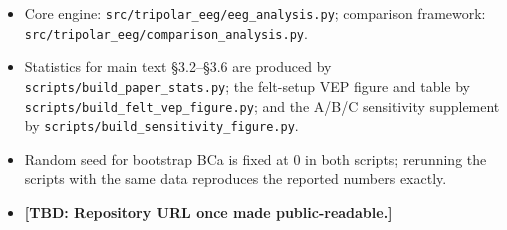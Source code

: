 \documentclass[10pt,a4paper]{article}
\newcommand{\TBD}[1]{{\color{red}\textbf{[TBD: #1]}}}
\begin{document}
\begin{itemize}
\item Core engine: \texttt{src/tripolar\_eeg/eeg\_analysis.py}; comparison framework: \texttt{src/tripolar\_eeg/comparison\_analysis.py}.
\item Statistics for main text §3.2--§3.6 are produced by \texttt{scripts/build\_paper\_stats.py}; the felt-setup VEP figure and table by \texttt{scripts/build\_felt\_vep\_figure.py}; and the A/B/C sensitivity supplement by \texttt{scripts/build\_sensitivity\_figure.py}.
\item Random seed for bootstrap BCa is fixed at 0 in both scripts; rerunning the scripts with the same data reproduces the reported numbers exactly.
\item \TBD{Repository URL once made public-readable.}
\end{itemize}
\end{document}
